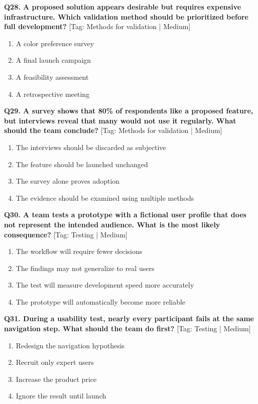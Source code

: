 \noindent\textbf{Q28. A proposed solution appears desirable but requires expensive infrastructure. Which validation method should be prioritized before full development?} \hfill [Tag: Methods for validation | Medium]
\begin{enumerate}[label=(\alph*),topsep=2pt,itemsep=1pt,partopsep=0pt,parsep=0pt]
    \item {A color preference survey}
    \item {A final launch campaign}
    \item {A feasibility assessment}
    \item {A retrospective meeting}
\end{enumerate}
\vspace{2mm}

\noindent\textbf{Q29. A survey shows that 80\% of respondents like a proposed feature, but interviews reveal that many would not use it regularly. What should the team conclude?} \hfill [Tag: Methods for validation | Medium]
\begin{enumerate}[label=(\alph*),topsep=2pt,itemsep=1pt,partopsep=0pt,parsep=0pt]
    \item {The interviews should be discarded as subjective}
    \item {The feature should be launched unchanged}
    \item {The survey alone proves adoption}
    \item {The evidence should be examined using multiple methods}
\end{enumerate}
\vspace{2mm}

\noindent\textbf{Q30. A team tests a prototype with a fictional user profile that does not represent the intended audience. What is the most likely consequence?} \hfill [Tag: Testing | Medium]
\begin{enumerate}[label=(\alph*),topsep=2pt,itemsep=1pt,partopsep=0pt,parsep=0pt]
    \item {The workflow will require fewer decisions}
    \item {The findings may not generalize to real users}
    \item {The test will measure development speed more accurately}
    \item {The prototype will automatically become more reliable}
\end{enumerate}
\vspace{2mm}

\noindent\textbf{Q31. During a usability test, nearly every participant fails at the same navigation step. What should the team do first?} \hfill [Tag: Testing | Medium]
\begin{enumerate}[label=(\alph*),topsep=2pt,itemsep=1pt,partopsep=0pt,parsep=0pt]
    \item {Redesign the navigation hypothesis}
    \item {Recruit only expert users}
    \item {Increase the product price}
    \item {Ignore the result until launch}
\end{enumerate}
\vspace{2mm}

